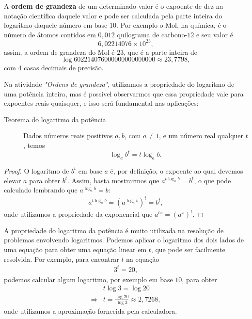 \begin{knowledge}
A \textbf{ordem de grandeza} de um determinado valor é o expoente de dez na notação científica daquele valor e pode ser calculada pela parte inteira do logaritmo daquele número em base $10$. Por exemplo o Mol, na química, é o número de átomos contidos em $0{,}012$ quilograma de carbono-$12$ e seu valor é
$$
6{,}02214076 \times 10^{23},
$$
assim, a ordem de grandeza do Mol é $23$, que é a parte inteira de $$\log 602214076000000000000000 \approx 23{,}7798,$$ com $4$ casas decimais de precisão.
\end{knowledge}

Na atividade \textit{"Ordens de grandeza"}, utilizamos a propriedade do logaritmo de uma potência inteira, mas é possível observarmos que essa propriedade vale para expoentes reais quaisquer, e isso será fundamental nas aplicações:

 
\begin{description}
\item[Teorema do logaritmo da potência]\label{teo_log_pot} 
Dados números reais positivos $a,b$, com $a \neq 1$, e um número real qualquer $t$, temos
$$
\log_a b^t = t\log_a b.
$$
\end{description}
\begin{proof}
O logaritmo de $b^t$ em base $a$ é, por definição, o expoente ao qual devemos elevar $a$ para obter $b^t$. Assim, basta mostrarmos que $a^{t\log_a b} =b^t$, o que pode calculado lembrando que $a^{\log_a b}=b$:
\begin{align*}
a^{t\log_a b} = (a^{\log_a b})^t = b^t,
\end{align*}
onde utilizamos a propriedade da exponencial que $a^{tx} = (a^{x})^t$.
\end{proof}

\begin{observation}{}
A propriedade do logaritmo da potência é muito utilizada na resolução de problemas envolvendo logaritmos. Podemos aplicar o logaritmo dos dois lados de uma equação para obter uma equação linear em $t$, que pode ser facilmente resolvida. Por exemplo, para encontrar $t$ na equação
\begin{align*}
3^t=20,
\end{align*}
podemos calcular algum logaritmo, por exemplo em base $10$, para obter
\begin{align*}
&t\log 3=\log 20\\
\Longrightarrow &t = \frac{\log 20}{\log 3} \approx 2{,}7268,
\end{align*}
onde utilizamos a aproximação fornecida pela calculadora.
\end{observation}

